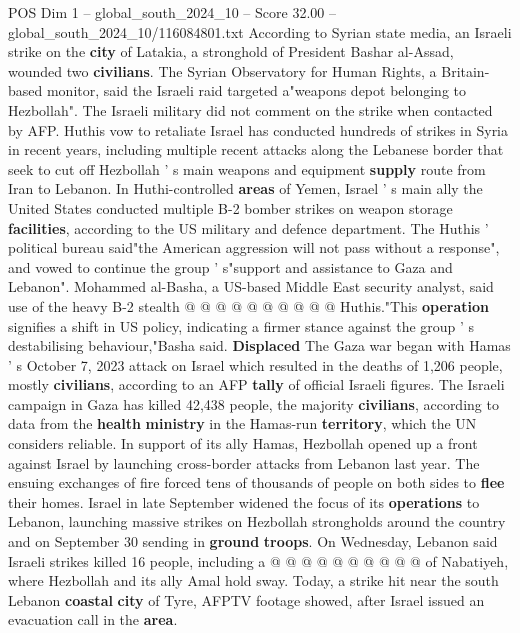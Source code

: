 \begin{textsample}{POS Dim 1 – global\_south\_2024\_10 – Score 32.00 – global\_south\_2024\_10/116084801.txt}  \label{ex:f1_pos_168}
According to Syrian state media, an Israeli strike on the \textbf{city} of Latakia, a stronghold of President Bashar al-Assad, wounded two \textbf{civilians}.
The Syrian Observatory for Human Rights, a Britain-based monitor, said the Israeli raid targeted a"weapons depot belonging to Hezbollah".
The Israeli military did not comment on the strike when contacted by AFP.
Huthis vow to retaliate Israel has conducted hundreds of strikes in Syria in recent years, including multiple recent attacks along the Lebanese border that seek to cut off Hezbollah ' s main weapons and equipment \textbf{supply} route from Iran to Lebanon.
In Huthi-controlled \textbf{areas} of Yemen, Israel ' s main ally the United States conducted multiple B-2 bomber strikes on weapon storage \textbf{facilities}, according to the US military and defence department.
The Huthis ' political bureau said"the American aggression will not pass without a response", and vowed to continue the group ' s"support and assistance to Gaza and Lebanon".
Mohammed al-Basha, a US-based Middle East security analyst, said use of the heavy B-2 stealth @ @ @ @ @ @ @ @ @ @ Huthis."This \textbf{operation} signifies a shift in US policy, indicating a firmer stance against the group ' s destabilising behaviour,"Basha said. \textbf{Displaced} The Gaza war began with Hamas ' s October 7, 2023 attack on Israel which resulted in the deaths of 1,206 people, mostly \textbf{civilians}, according to an AFP \textbf{tally} of official Israeli figures.
The Israeli campaign in Gaza has killed 42,438 people, the majority \textbf{civilians}, according to data from the \textbf{health} \textbf{ministry} in the Hamas-run \textbf{territory}, which the UN considers reliable.
In support of its ally Hamas, Hezbollah opened up a front against Israel by launching cross-border attacks from Lebanon last year.
The ensuing exchanges of fire forced tens of thousands of people on both sides to \textbf{flee} their homes.
Israel in late September widened the focus of its \textbf{operations} to Lebanon, launching massive strikes on Hezbollah strongholds around the country and on September 30 sending in \textbf{ground} \textbf{troops}.
On Wednesday, Lebanon said Israeli strikes killed 16 people, including a @ @ @ @ @ @ @ @ @ @ of Nabatiyeh, where Hezbollah and its ally Amal hold sway.
Today, a strike hit near the south Lebanon \textbf{coastal} \textbf{city} of Tyre, AFPTV footage showed, after Israel issued an evacuation call in the \textbf{area}.

\end{textsample}
